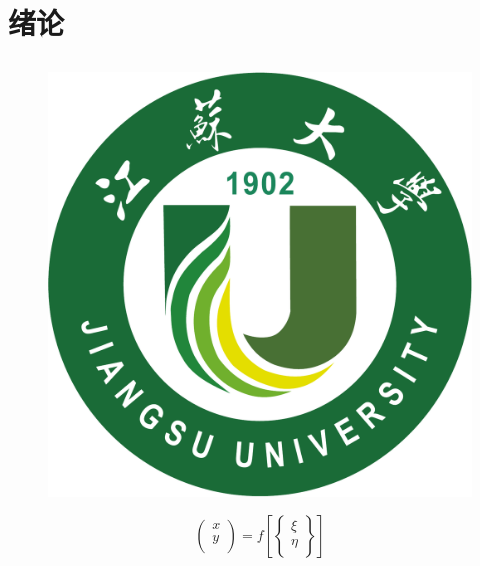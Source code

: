 \chapter{绪论}



\section{}
\subsection{}
\subsubsection{}

\begin{figure}[!h]
	\centering
	{\includegraphics[scale=0.1]{Figures/logo/ujslogo.pdf}}
	\label{Jiangsu University}
\end{figure}


\begin{equation}\label{transformation}
	\left(\begin{array}{l}
		x \\
		y \\
	\end{array}\right)=f\left[\left\{\begin{array}{l}
		\xi \\
		\eta \\
	\end{array}\right\}\right]
\end{equation}

